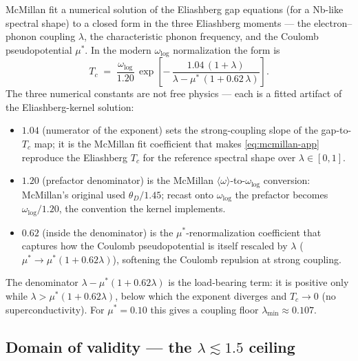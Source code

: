 McMillan \citep{mcmillan1968} fit a numerical solution of the Eliashberg
gap equations (for a Nb-like spectral shape) to a closed form in the three
Eliashberg moments --- the electron--phonon coupling $\lambda$, the
characteristic phonon frequency, and the Coulomb pseudopotential $\mu^{*}$.
In the modern $\omega_{\log}$ normalization the form is
\begin{equation}
T_c \;=\; \frac{\omega_{\log}}{1.20}\,
  \exp\!\left[-\,\frac{1.04\,(1+\lambda)}
                     {\lambda - \mu^{*}\,(1+0.62\,\lambda)}\right].
\label{eq:mcmillan-app}
\end{equation}
The three numerical constants are not free physics --- each is a fitted
artifact of the Eliashberg-kernel solution:
\begin{itemize}\itemsep0.25em
\item \textbf{$1.04$} (numerator of the exponent) sets the strong-coupling
  slope of the gap-to-$T_c$ map; it is the McMillan fit coefficient that
  makes \eqref{eq:mcmillan-app} reproduce the Eliashberg $T_c$ for the
  reference spectral shape over $\lambda\!\in\![0,1]$.
\item \textbf{$1.20$} (prefactor denominator) is the McMillan
  $\langle\omega\rangle$-to-$\omega_{\log}$ conversion: McMillan's original
  used $\theta_D/1.45$; recast onto $\omega_{\log}$ the prefactor becomes
  $\omega_{\log}/1.20$, the convention the kernel implements.
\item \textbf{$0.62$} (inside the denominator) is the
  $\mu^{*}$-renormalization coefficient that captures how the Coulomb
  pseudopotential is itself rescaled by $\lambda$
  ($\mu^{*}\!\to\!\mu^{*}(1+0.62\lambda)$), softening the Coulomb
  repulsion at strong coupling.
\end{itemize}
The denominator $\lambda - \mu^{*}(1+0.62\lambda)$ is the load-bearing
term: it is positive only while $\lambda > \mu^{*}(1+0.62\lambda)$, below
which the exponent diverges and $T_c\!\to\!0$ (no superconductivity). For
$\mu^{*}=0.10$ this gives a coupling floor $\lambda_{\min}\!\approx\!0.107$.

\subsection{Domain of validity --- the $\lambda\!\lesssim\!1.5$ ceiling}
\label{app:mcmillan-domain}

